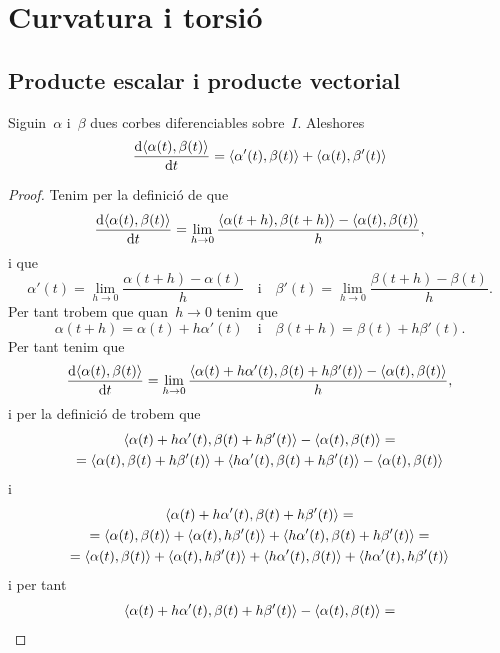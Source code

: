 \documentclass[../../Main.tex]{subfiles}
\begin{document}
\section{Curvatura i torsió}
	\subsection{Producte escalar i producte vectorial}
	\begin{proposition}
		\label{prop:derivada del producte escalar de dues corbes}
		Siguin~\(\alpha\) i~\(\beta\) dues corbes diferenciables sobre~\(I\).
		Aleshores
		\[
		    \frac{\diff\prodesc{\alpha(t)}{\beta(t)}}{\diff t}=\prodesc{\alpha'(t)}{\beta(t)}+\prodesc{\alpha(t)}{\beta'(t)}
		\]
		\begin{proof}
			Tenim per la definició de  que
			\[
			    \frac{\diff\prodesc{\alpha(t)}{\beta(t)}}{\diff t}=\lim_{h\to0}\frac{\prodesc{\alpha(t+h)}{\beta(t+h)}-\prodesc{\alpha(t)}{\beta(t)}}{h},
			\]
			i que
			\[
			    \alpha'(t)=\lim_{h\to0}\frac{\alpha(t+h)-\alpha(t)}{h}\quad\text{i}\quad\beta'(t)=\lim_{h\to0}\frac{\beta(t+h)-\beta(t)}{h}.
			\]
			Per tant trobem que quan~\(h\to0\) tenim que
			\[
			    \alpha(t+h)=\alpha(t)+h\alpha'(t)\quad\text{i}\quad\beta(t+h)=\beta(t)+h\beta'(t).
			\]
			Per tant tenim que
			\[
			    \frac{\diff\prodesc{\alpha(t)}{\beta(t)}}{\diff t}=\lim_{h\to0}\frac{\prodesc{\alpha(t)+h\alpha'(t)}{\beta(t)+h\beta'(t)}-\prodesc{\alpha(t)}{\beta(t)}}{h},
			\]
			i per la definició de  trobem que
			\begin{multline*}
				\prodesc{\alpha(t)+h\alpha'(t)}{\beta(t)+h\beta'(t)}-\prodesc{\alpha(t)}{\beta(t)}=\\
				=\prodesc{\alpha(t)}{\beta(t)+h\beta'(t)}+\prodesc{h\alpha'(t)}{\beta(t)+h\beta'(t)}-\prodesc{\alpha(t)}{\beta(t)}
			\end{multline*}
			i
			\begin{multline*}
				\prodesc{\alpha(t)+h\alpha'(t)}{\beta(t)+h\beta'(t)}=\\
				=\prodesc{\alpha(t)}{\beta(t)}+\prodesc{\alpha(t)}{h\beta'(t)}+\prodesc{h\alpha'(t)}{\beta(t)+h\beta'(t)}=\\
				=\prodesc{\alpha(t)}{\beta(t)}+\prodesc{\alpha(t)}{h\beta'(t)}+\prodesc{h\alpha'(t)}{\beta(t)}+\prodesc{h\alpha'(t)}{h\beta'(t)}
			\end{multline*}
			i per tant
			\begin{multline*}
				\prodesc{\alpha(t)+h\alpha'(t)}{\beta(t)+h\beta'(t)}-\prodesc{\alpha(t)}{\beta(t)}=\\

\end{multline*}
\end{proof}
\end{proposition}
\end{document}
